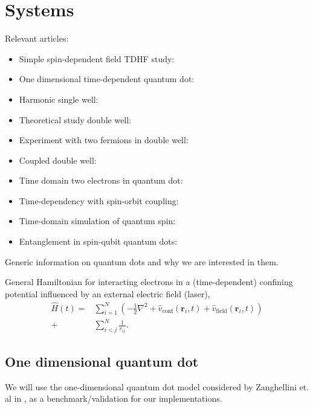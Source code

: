 \documentclass[aip,jcp,reprint,floatfix]{revtex4-1}
\newcommand{\vconf}{\hat{v}_{\text{conf}}}
\newcommand{\vfield}{\hat{v}_{\text{field}}}
\begin{document}
\section{Systems}
    Relevant articles:
    \begin{itemize}
        \item Simple spin-dependent field TDHF study:\cite{TDHF_Singlet_Triplet}
        \item One dimensional time-dependent quantum dot: \cite{Zanghellini04}
        \item Harmonic single well: \cite{HjorthJensenQD_2017}
        \item Theoretical study double well: \cite{Double_Well_2000}
        \item Experiment with two fermions in double well: \cite{Fermions_Double_Well_Experiment}
        \item Coupled double well: \cite{Coupled_double_wells}
        \item Time domain two electrons in quantum dot: \cite{TimeDomainTwoElectronsQuantumDot}
        \item Time-dependency with spin-orbit coupling: \cite{Spin_orbit_coupling}
        \item Time-domain simulation of quantum spin: \cite{Time_domain_quantum_spin}
        \item Entanglement in spin-qubit quantum dots: \cite{Entanglement_spin_qubit_quantum_dots}
    \end{itemize}
    
    Generic information on quantum dots and why we are interested in them.
    
    
    General Hamiltonian for interacting electrons in a (time-dependent) confining potential influenced by an external electric field (laser),
    \begin{align}
    \hat{H}(t) = &\sum_{i=1}^N \left( - \frac{1}{2}\nabla^2 + \vconf(\mathbf{r}_i,t) + \vfield(\mathbf{r}_i,t) \right) \nonumber \\ 
    + &\sum_{i < j}^N \frac{1}{r_{ij}}.
    \label{eq:general_hamiltonian}
    \end{align}
    
    \subsection{One dimensional quantum dot}
        We will use the one-dimensional quantum dot model considered by Zanghellini et. al in \cite{Zanghellini04}, as a benchmark/validation for our implementations.
    
\end{document}
